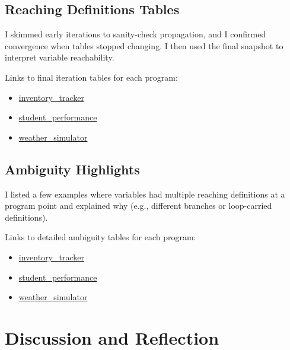 \documentclass[10pt,a4paper]{report}
\begin{document}
\subsection{Reaching Definitions Tables}
I skimmed early iterations to sanity-check propagation, and I confirmed convergence when tables stopped changing. I then used the final snapshot to interpret variable reachability.

Links to final iteration tables for each program:
\begin{itemize}[itemsep=0em, topsep=0pt]
    \item \href{https://github.com/ShardulJunagade/cs202-stt/tree/main/lab7/output/inventory_tracker/reaching_definitions_iterations.md}{inventory\_tracker}
    \item \href{https://github.com/ShardulJunagade/cs202-stt/tree/main/lab7/output/student_performance/reaching_definitions_iterations.md}{student\_performance}
    \item \href{https://github.com/ShardulJunagade/cs202-stt/tree/main/lab7/output/weather_simulator/reaching_definitions_iterations.md}{weather\_simulator}
\end{itemize}

\subsection{Ambiguity Highlights}
I listed a few examples where variables had multiple reaching definitions at a program point and explained why (e.g., different branches or loop-carried definitions).

Links to detailed ambiguity tables for each program:
\begin{itemize}[itemsep=0em, topsep=0pt]
    \item \href{https://github.com/ShardulJunagade/cs202-stt/tree/main/lab7/output/inventory_tracker/ambiguity.md}{inventory\_tracker}
    \item \href{https://github.com/ShardulJunagade/cs202-stt/tree/main/lab7/output/student_performance/ambiguity.md}{student\_performance}
    \item \href{https://github.com/ShardulJunagade/cs202-stt/tree/main/lab7/output/weather_simulator/ambiguity.md}{weather\_simulator}
\end{itemize}

\section{Discussion and Reflection}
\end{document}
